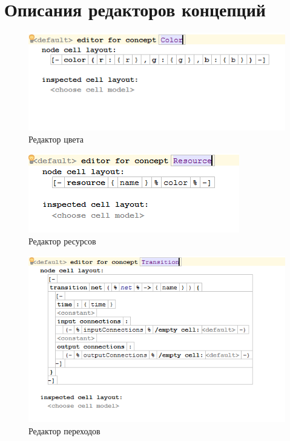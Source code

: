 







\chapter{Описания редакторов концепций} \label{AppendixC}

\begin{figure}[ht]
	\centering
	\includegraphics[width=0.7\linewidth]{images/editor/Color}
	\caption{Редактор цвета}
	\label{fig:color}
\end{figure}

\begin{figure}[ht]
	\centering
	\includegraphics[width=0.7\linewidth]{images/editor/Resource}
	\caption{Редактор ресурсов}
	\label{fig:resource}
\end{figure}

\begin{figure}[ht]
	\centering
	\includegraphics[width=0.7\linewidth]{images/editor/Transition}
	\caption{Редактор переходов}
	\label{fig:transition}
\end{figure}

